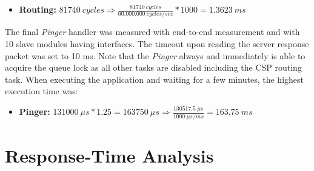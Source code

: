 \begin{itemize}
	\item \textbf{Routing:} $81740\ cycles \Rightarrow \frac{81740\ cycles}{60.000.000\ cycles/sec} * 1000 = 1.3623\ ms$
\end{itemize}

The final \textit{Pinger} handler was measured with end-to-end measurement and with 10 slave modules having \iic interfaces. The timeout upon reading the server response packet was set to 10 ms. Note that the \textit{Pinger} always and immediately is able to acquire the queue lock as all other tasks are disabled including the CSP routing task. When executing the application and waiting for a few minutes, the highest execution time was:

\begin{itemize}
	\item \textbf{Pinger:} $131000\ \mu s * 1.25 = 163750\ \mu s \Rightarrow \frac{130517.5\ \mu s}{1000\ \mu s /ms} = 163.75\ ms$
\end{itemize}

\section{Response-Time Analysis}
